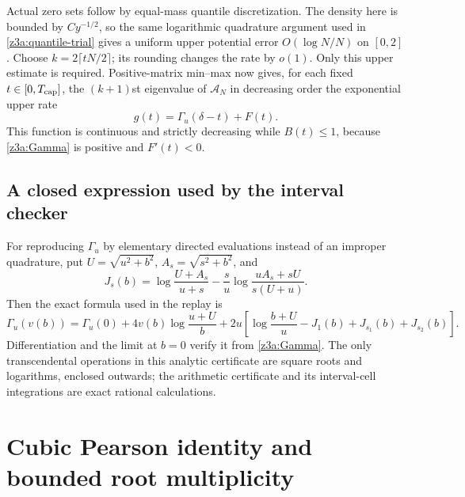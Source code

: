 \documentclass[11pt]{article}
\theoremstyle{definition}\newtheorem{definition}[theorem]{Definition}
\theoremstyle{remark}\newtheorem{remark}[theorem]{Remark}
\begin{document}
Actual zero sets follow by equal-mass quantile discretization.  The
density here is bounded by $Cy^{-1/2}$, so the same logarithmic
quadrature argument used in \eqref{z3a:quantile-trial} gives a uniform
upper potential error $O(\log N/N)$ on $[0,2]$.  Choose
$k=2\lceil tN/2\rceil$; its rounding changes the rate by $o(1)$.  Only
this upper estimate is required.  Positive-matrix min--max now gives,
for each fixed $t\in[0,T_{\rm cap}]$, the $(k+1)$st eigenvalue of
$\mathcal A_N$ in decreasing order the exponential upper rate
\begin{equation}\label{z3a:envelope}
 g(t)=\Gamma_u(\delta-t)+F(t).
\end{equation}
This function is continuous and strictly decreasing while $B(t)\le1$,
because \eqref{z3a:Gamma} is positive and $F'(t)<0$.


\subsection{A closed expression used by the interval checker}

For reproducing $\Gamma_u$ by elementary directed evaluations instead of
an improper quadrature, put $U=\sqrt{u^2+b^2}$,
$A_s=\sqrt{s^2+b^2}$, and
\[
 J_s(b)=\log\frac{U+A_s}{u+s}
 -\frac{s}{u}\log\frac{uA_s+sU}{s(U+u)}.
\]
Then the exact formula used in the replay is
\[
 \Gamma_u(v(b))=\Gamma_u(0)
 +4v(b)\log\frac{u+U}{b}
 +2u\left[\log\frac{b+U}{u}-J_1(b)+J_{s_1}(b)+J_{s_2}(b)\right].
\]
Differentiation and the limit at $b=0$ verify it from
\eqref{z3a:Gamma}.  The only transcendental operations in this analytic
certificate are square roots and logarithms, enclosed outwards; the
arithmetic certificate and its interval-cell integrations are exact
rational calculations.


\section{Cubic Pearson identity and bounded root multiplicity}
\label{zthree:nullity}
\end{document}
